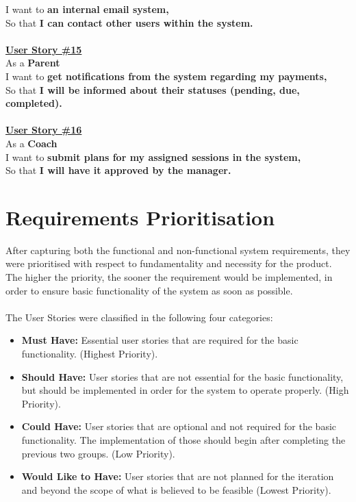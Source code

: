 \documentclass{l3proj}
\begin{document}
I want to \textbf{an internal email system,}\\
So that \textbf{I can contact other users within the system.}\\
\\
\textbf{\underline{User Story \#15}}\\
As a \textbf{Parent}\\
I want to \textbf{get notifications from the system regarding my payments,}\\
So that \textbf{I will be informed about their statuses (pending, due, completed).}\\
\\
\textbf{\underline{User Story \#16}}\\
As a \textbf{Coach}\\
I want to \textbf{submit plans for my assigned sessions in the system,}\\
So that \textbf{I will have it approved by the manager.}\\

\section{Requirements Prioritisation}
\par After capturing both the functional and non-functional system requirements,  they were prioritised with respect to fundamentality and necessity for the product. The higher the priority, the sooner the requirement would be implemented, in order to ensure basic functionality of the system as soon as possible.\\
\\
The User Stories were classified in the following four categories: 
\begin{itemize}
	\item \textbf{Must Have:} Essential user stories that are required for the basic functionality. (Highest Priority).
	\item \textbf{Should Have:} User stories that are not essential for the basic functionality, but should be implemented in order for the system to operate properly. (High Priority).
	\item \textbf{Could Have:} User stories that are optional and not required for the basic functionality. The implementation of those should begin after completing the previous two groups. (Low Priority).
	\item \textbf{Would Like to Have:} User stories that are not planned for the iteration and beyond the scope of what is believed to be feasible (Lowest Priority).
\end{itemize}
\end{document}
